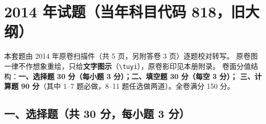 \chapter{2014 年试题（当年科目代码 818，旧大纲）}

\begin{tishi}
本套题由 2014 年原卷扫描件（共 5 页，另附答卷 3 页）逐题校对转写。
原卷图一律不作想象重绘，只给\textbf{文字图示}（\verb|\tuyi|），原卷影印见本册附录。
卷面分值结构：\textbf{一、选择题 30 分（每小题 3 分）；二、填空题 30 分（每空 3 分）；
三、计算题 90 分}（其中 1--7 题必做，8--11 题任选做两道）。全卷满分 150 分。
\end{tishi}

\section{一、选择题（共 30 分，每小题 3 分）}

